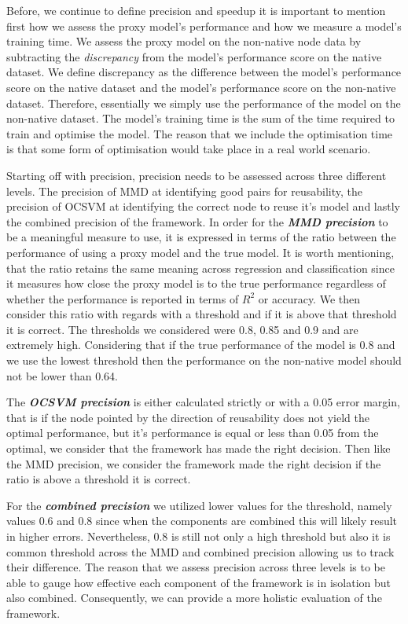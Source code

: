\documentclass{mpaper}
\begin{document}
Before, we continue to define precision and speedup it is important to mention first how we assess the proxy model's performance and how we measure a model's training time. We assess the proxy model on the non-native node data by subtracting the \textit{discrepancy} from the model's performance score on the native dataset. We define discrepancy as the difference between the model's performance score on the native dataset and the model's performance score on the non-native dataset. Therefore, essentially we simply use the performance of the model on the non-native dataset. The model's training time is the sum of the time required to train and optimise the model. The reason that we include the optimisation time is that some form of optimisation would take place in a real world scenario.

Starting off with precision, precision needs to be assessed across three different levels. The precision of MMD at identifying good pairs for reusability, the precision of OCSVM at identifying the correct node to reuse it's model and lastly the combined precision of the framework. In order for the \textbf{\textit{MMD precision}} to be a meaningful measure to use, it is expressed in terms of the ratio between the performance of using a proxy model and the true model. It is worth mentioning, that the ratio retains the same meaning across regression and classification since it measures how close the proxy model is to the true performance regardless of whether the performance is reported in terms of $R^2$ or accuracy. We then consider this ratio with regards with a threshold and if it is above that threshold it is correct. The thresholds we considered were 0.8, 0.85 and 0.9 and are extremely high. Considering that if the true performance of the model is 0.8 and we use the lowest threshold then the performance on the non-native model should not be lower than 0.64. 

The \textbf{\textit{OCSVM precision}} is either calculated strictly or with a 0.05 error margin, that is if the node pointed by the direction of reusability does not yield the optimal performance, but it's performance is equal or less than 0.05 from the optimal, we consider that the framework has made the right decision. Then like the MMD precision, we consider the framework made the right decision if the ratio is above a threshold it is correct. 

For the \textbf{\textit{combined precision}} we utilized lower values for the threshold, namely values 0.6 and 0.8 since when the components are combined this will likely result in higher errors. Nevertheless, 0.8 is still not only a high threshold but also it is common threshold across the MMD and combined precision allowing us to track their difference. The reason that we assess precision across three levels is to be able to gauge how effective each component of the framework is in isolation but also combined. Consequently, we can provide a more holistic evaluation of the framework. 
\end{document}
